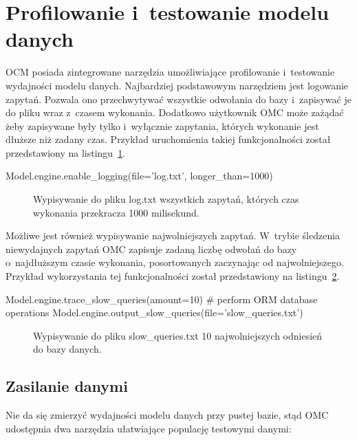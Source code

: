 \section{Profilowanie i~testowanie modelu danych}

OCM posiada zintegrowane narzędzia umożliwiające profilowanie i~testowanie wydajności modelu danych. Najbardziej podstawowym narzędziem jest logowanie zapytań. Pozwala ono przechwytywać wszystkie odwołania do bazy i~zapisywać je do pliku wraz z~czasem wykonania. Dodatkowo użytkownik OMC może zażądać żeby zapisywane były tylko i~wyłącznie zapytania, których wykonanie jest dłuższe niż zadany czas. Przykład uruchomienia takiej funkcjonalności został przedstawiony na listingu~\ref{vrb:engine_logging}.

\begin{verbbox}
	Model.engine.enable_logging(file='log.txt', longer_than=1000)
\end{verbbox}

\begin{figure}[ht!]
	\centering
	\theverbbox
	\caption{Wypisywanie do pliku log.txt wszystkich zapytań, których czas wykonania przekracza 1000 milisekund.}
	\label{vrb:engine_logging}
\end{figure}

Możliwe jest również wypisywanie najwolniejszych zapytań. W~trybie śledzenia niewydajnych zapytań OMC zapisuje zadaną liczbę odwołań do bazy o~najdłuższym czasie wykonania, posortowanych zaczynając od najwolniejszego. Przykład wykorzystania tej funkcjonalności został przedstawiony na listingu~\ref{vrb:engine_slow_queries}.

\begin{verbbox}
	Model.engine.trace_slow_queries(amount=10)
	# perform ORM database operations
	Model.engine.output_slow_queries(file='slow_queries.txt')
\end{verbbox}

\begin{figure}[ht!]
	\centering
	\theverbbox
	\caption{Wypisywanie do pliku slow\_queries.txt 10 najwolniejszych odniesień do bazy danych.}
	\label{vrb:engine_slow_queries}
\end{figure}

\subsection{Zasilanie danymi}

Nie da się zmierzyć wydajności modelu danych przy pustej bazie, stąd OMC udostępnia dwa narzędzia ułatwiające populację testowymi danymi:

